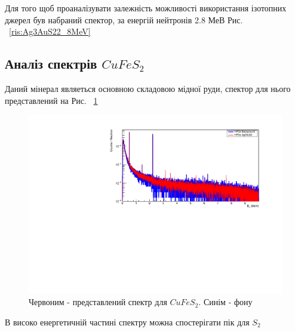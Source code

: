 \documentclass[a4paper, 14pt]{article}
\numberwithin{equation}{section}
\numberwithin{table}{section}
\begin{document}
	Для того щоб проаналізувати залежність можливості використання ізотопних джерел був набраний спектор, за енергій нейтронів 2.8 МеВ Рис. ~\ref{ris:Ag3AuS22_8MeV}
	
	\subsection{Аналіз спектрів $CuFeS_2$}
	Даний мінерал являеться основною складовою мідної руди, спектор для нього представлений на Рис. ~\ref{ris:CuFeS_2Fon}
	\begin{figure}[hbt!]
		\centering \includegraphics[width=1\textwidth]{res/smCuFeS2FonAll.pdf}
		\caption{Червоним - представлений спектр для $CuFeS_2$. Синім - фону} 
		\label{ris:CuFeS_2Fon}	
	\end{figure} 	
	В високо енергетичній частині спектру можна спостерігати пік для $S_2$
	
\end{document}
